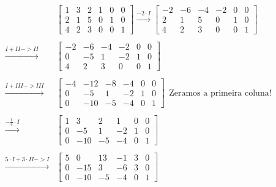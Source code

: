 \documentclass[
  letterpaper,
  DIV=11,
  numbers=noendperiod]{scrreprt}
\begin{document}
\[
\begin{aligned}
    &\left[\begin{array}{ccc|ccc}
        1 & 3 & 2 & 1 & 0 & 0 \\
        2 & 1 & 5 & 0 & 1 & 0 \\
        4 & 2 & 3 & 0 & 0 & 1
    \end{array}\right]  \stackrel{-2\cdot I}{\rightarrow}
    \left[\begin{array}{ccc|ccc}
        -2 & -6 & -4 & -2 & 0 & 0 \\
        2 & 1 & 5 & 0 & 1 & 0 \\
        4 & 2 & 3 & 0 & 0 & 1
    \end{array}\right] \\ \\
    \stackrel{I+II->II}{\rightarrow}
    &
    \left[\begin{array}{ccc|ccc}
        -2 & -6 & -4 & -2 & 0 & 0 \\
        0 & -5 & 1 & -2 & 1 & 0 \\
        4 & 2 & 3 & 0 & 0 & 1
    \end{array}\right] \\ \\
    \stackrel{I+III->III}{\rightarrow}
    &
    \left[\begin{array}{ccc|ccc}
        -4 & -12 & -8 & -4 & 0 & 0 \\
        0 & -5 & 1 & -2 & 1 & 0 \\
        0 & -10 & -5 & -4 & 0 & 1
    \end{array}\right] ~~\text{Zeramos a primeira coluna!} \\ \\
    \stackrel{-\frac{1}{4}\cdot I}{\rightarrow}
    &
    \left[\begin{array}{ccc|ccc}
        1 & 3 & 2 & 1 & 0 & 0 \\
        0 & -5 & 1 & -2 & 1 & 0 \\
        0 & -10 & -5 & -4 & 0 & 1
    \end{array}\right] \\ \\
    \stackrel{5\cdot I+3\cdot II -> I}{\rightarrow}
    &
    \left[\begin{array}{ccc|ccc}
        5 & 0 & 13 & -1 & 3 & 0 \\
        0 & -15 & 3 & -6 & 3 & 0 \\
        0 & -10 & -5 & -4 & 0 & 1
    \end{array}\right] \\ \\

\end{aligned}\]
\end{document}
